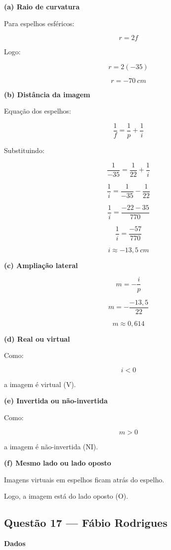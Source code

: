 \documentclass[12pt,a4paper]{article}
\begin{document}
\textbf{(a) Raio de curvatura}

Para espelhos esféricos:

\[
r=2f
\]

Logo:

\[
r=2(-35)
\]

\[
r=-70\ cm
\]

\vspace{0.5cm}

\textbf{(b) Distância da imagem}

Equação dos espelhos:

\[
\frac{1}{f}=\frac{1}{p}+\frac{1}{i}
\]

Substituindo:

\[
\frac{1}{-35}=\frac{1}{22}+\frac{1}{i}
\]

\[
\frac{1}{i}
=
\frac{1}{-35}-\frac{1}{22}
\]

\[
\frac{1}{i}
=
\frac{-22-35}{770}
\]

\[
\frac{1}{i}
=
\frac{-57}{770}
\]

\[
i\approx-13,5\ cm
\]

\vspace{0.5cm}

\textbf{(c) Ampliação lateral}

\[
m=-\frac{i}{p}
\]

\[
m=-\frac{-13,5}{22}
\]

\[
m\approx0,614
\]

\vspace{0.5cm}

\textbf{(d) Real ou virtual}

Como:

\[
i<0
\]

a imagem é virtual (V).

\vspace{0.5cm}

\textbf{(e) Invertida ou não-invertida}

Como:

\[
m>0
\]

a imagem é não-invertida (NI).

\vspace{0.5cm}

\textbf{(f) Mesmo lado ou lado oposto}

Imagens virtuais em espelhos ficam atrás do espelho.

Logo, a imagem está do lado oposto (O).

\subsection{Questão 17 — Fábio Rodrigues}
\textbf{Dados}
\end{document}
